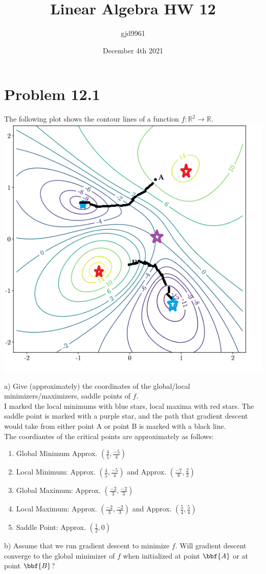 \documentclass[12pt,twoside]{article}
\title{Linear Algebra HW 12}
\author{gjd9961}
\date{December 4th 2021}
\newcommand{\R}{\mathbb{R}}
\begin{document}
\maketitle
\section{Problem 12.1}The following plot shows the contour lines of a function $f:\R^2 \to \R$.\\
\includegraphics[scale=1]{image.png}

\newpage

a) Give (approximately) the coordinates of the global/local minimizers/maximizers, saddle points of $f$.\\

I marked the local minimums with blue stars, local maxima with red stars. The saddle point is marked with a purple star, and the path that gradient descent would take from either point A or point B is marked with a black line.\\

The coordiantes of the critical points are approximately as follows:
\begin{enumerate}
    \item Global Minimum Approx. $(\frac{4}{5},\frac{-5}{4})$
    \item Local Minimum: Approx. $(\frac{4}{5},\frac{-5}{4})$ and Approx. $(\frac{-7}{8},\frac{2}{3})$
    \item Global Maximum: Approx. $(\frac{-2}{3},\frac{-2}{3})$
    \item Local Maximum: Approx. $(\frac{-2}{3},\frac{-2}{3})$ and Approx. $(\frac{5}{4},\frac{5}{4})$
    \item Saddle Point: Approx. $(\frac{1}{2},0)$
    
\end{enumerate}
b) Assume that we run gradient descent to minimize $f$. Will gradient descent converge to the global minimizer of $f$ when initialized at point $\bbf{A}$ or at point $\bbf{B}$? \\
\end{document}
